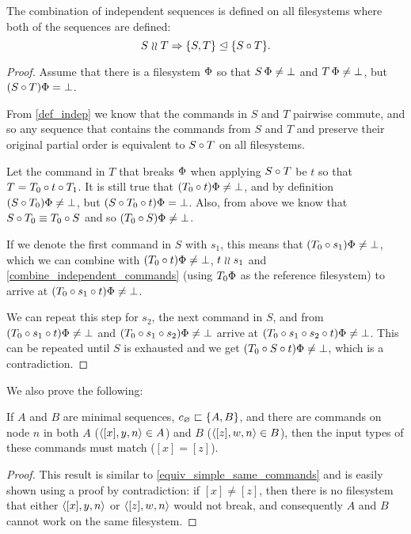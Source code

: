 \begin{mylem}\label{combine_independent_sequences}
The combination of independent sequences is defined on all filesystems
where both of the sequences are defined:
\[ S\mathrel{\wr\wr} T \Rightarrow {\{S,T\}}\trianglelefteq{\{S\circ T\}}. \]
\end{mylem}
\begin{proof}
Assume that there is a filesystem $\Phi$ so that
$S\,\Phi\neq\bot$ and $T\,\Phi\neq\bot$, but
$(S\circ T)\Phi=\bot$.

From \cref{def_indep} we know that
the commands in $S$ and $T$ pairwise commute, and so any sequence
that contains the commands from $S$ and $T$ and preserve their original partial order
is equivalent to $S\circ T$ on all filesystems.

Let the command in $T$ that breaks $\Phi$ when applying $S\circ T$ be $t$
so that $T=T_0\circ t\circ T_1$.
It is still true that $(T_0 \circ t)\Phi\neq\bot$,
and by definition $(S\circ T_0)\Phi\neq\bot$,
but $(S\circ T_0\circ t)\Phi=\bot$.
Also, from above we know that $S\circ T_0\equiv T_0\circ S$
and so $(T_0 \circ S)\Phi\neq\bot$.

If we denote the first command in $S$ with $s_1$,
this means that $(T_0 \circ s_1)\Phi\neq\bot$,
which we can combine with $(T_0 \circ t)\Phi\neq\bot$, $t\mathrel{\wr\wr} s_1$ and
\cref{combine_independent_commands}
(using $T_0\Phi$ as the reference filesystem)
to arrive at $(T_0 \circ s_1\circ t)\Phi\neq\bot$.

We can repeat this step for $s_2$, the next command in $S$,
and from 
$(T_0 \circ s_1\circ t)\Phi\neq\bot$
and
$(T_0 \circ s_1\circ s_2)\Phi\neq\bot$
arrive at
$(T_0 \circ s_1\circ s_2\circ t)\Phi\neq\bot$.
This can be repeated until $S$ is exhausted and we get
$(T_0 \circ S\circ t)\Phi\neq\bot$, which is a contradiction.
\end{proof}

We also prove the following:

\begin{mylem}\label{worksinputmatch}
If $A$ and $B$ are minimal sequences, $c_\varnothing\sqsubset{\{A,B\}}$,
and there are commands on node $n$ in both $A$ ($\langle{[x],y,n}\rangle\in A$) and $B$ ($\langle{[z],w,n}\rangle\in B$),
then the input types of these commands must match ($[x]=[z]$).
\end{mylem}
\begin{proof}
This result is similar to \cref{equiv_simple_same_commands} and
is easily shown using a proof by contradiction: if $[x]\neq [z]$, then there is no filesystem that
either $\langle{[x],y,n}\rangle$ or $\langle{[z],w,n}\rangle$ would not break, 
and consequently $A$ and $B$ cannot work on the same filesystem.
\end{proof}


